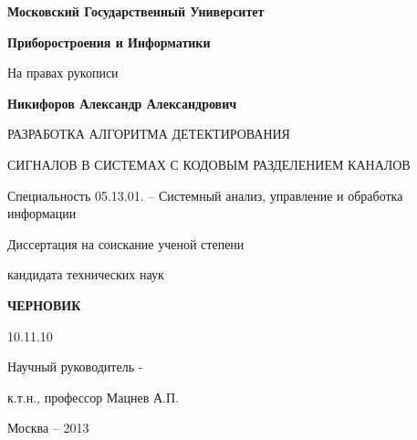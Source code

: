 \noindent\centerline{\bf{Московский Государственный Университет}}
\noindent\centerline{\bf{Приборостроения и Информатики}}
\vspace{\baselineskip}
\vspace{\baselineskip}

\hfill На правах рукописи

\vspace{\baselineskip}
\vspace{\baselineskip}

\noindent\centerline{\bf{Никифоров Александр Александрович}}

\vspace{\baselineskip}
\vspace{\baselineskip}

\noindent\centerline{РАЗРАБОТКА АЛГОРИТМА ДЕТЕКТИРОВАНИЯ}
\noindent\centerline{СИГНАЛОВ В СИСТЕМАХ С КОДОВЫМ РАЗДЕЛЕНИЕМ КАНАЛОВ}

\vspace{\baselineskip}
\vspace{\baselineskip}

\noindent\centerline{Специальность 05.13.01. – Системный анализ, управление и обработка информации}

\vspace{\baselineskip}
\vspace{\baselineskip}

\noindent\centerline{Диссертация на соискание ученой степени}
\noindent\centerline{кандидата технических наук}


\vspace{\baselineskip}
\vspace{\baselineskip}
\noindent\centerline{\bf{ЧЕРНОВИК}}
\noindent\centerline{10.11.10}

\vspace{\baselineskip}
\vspace{\baselineskip}

\hfill{Научный руководитель -}

\hfill{к.т.н., профессор Мацнев А.П.}

\vfill
\noindent\centerline{Москва – 2013}

\newpage
